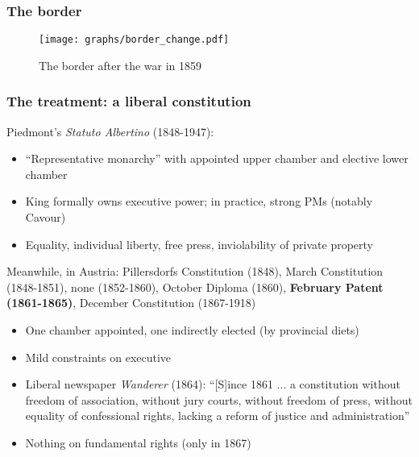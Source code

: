 \documentclass[10pt]{beamer}
\begin{document}
\begin{frame}
    \frametitle{The border}


    \begin{figure}
        \centering
        \texttt{[image: graphs/border\_change.pdf]}
        \caption{The border after the war in 1859}
        \label{fig:border_change}
    \end{figure}

\end{frame}

\begin{frame}
    \frametitle{The treatment: a liberal constitution}
    
    Piedmont's \textit{Statuto Albertino} (1848-1947):
    \begin{itemize}
        \item ``Representative monarchy'' with appointed upper chamber and elective lower chamber 
        \item King formally owns executive power; in practice, strong PMs (notably Cavour)
        \item Equality, individual liberty, free press, inviolability of private property
    \end{itemize}

    \pause
    \bigskip
    
    Meanwhile, in Austria: Pillersdorfs Constitution (1848), March Constitution (1848-1851), none (1852-1860), October Diploma (1860), \textbf{February Patent (1861-1865)}, December Constitution (1867-1918)

    \begin{itemize}
        \item One chamber appointed, one indirectly elected (by provincial diets) 
        \item Mild constraints on executive %
        \item Liberal newspaper \textit{Wanderer} (1864): ``[S]ince 1861 ... a constitution without freedom of association, without jury courts, without freedom of press, without equality of confessional rights, lacking a reform of justice and administration''
        \item Nothing on fundamental rights (only in 1867)
    \end{itemize}

\end{frame}
\end{document}
